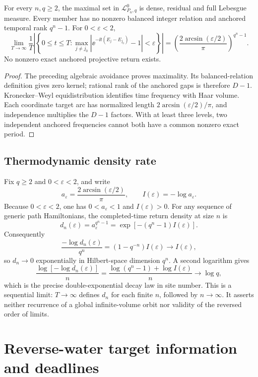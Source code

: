 \begin{theorem}
For every $n,q\ge2$, the maximal set in
$\mathcal L_{P_n,q}^0$ is dense, residual and full Lebesgue measure.  Every
member has no nonzero balanced integer relation and anchored temporal rank
$q^n-1$.  For $0<\varepsilon<2$,
\[
 \lim_{T\to\infty}\frac1T\left|\left\{0\le t\le T:
 \max_{j\ne j_0}|\ee^{-\ii t(E_j-E_{j_0})}-1|<\varepsilon
 \right\}\right|
 =\left(\frac{2\arcsin(\varepsilon/2)}\pi\right)^{q^n-1}.
\]
No nonzero exact anchored projective return exists.
\end{theorem}

\begin{proof}
The preceding algebraic avoidance proves maximality.  Its balanced-relation
definition gives zero kernel; rational rank of the anchored gaps is therefore
$D-1$.  Kronecker--Weyl equidistribution identifies time frequency with
Haar volume.  Each coordinate target arc has normalized length
$2\arcsin(\varepsilon/2)/\pi$, and independence multiplies the $D-1$
factors.  With at least three levels, two independent anchored frequencies
cannot both have a common nonzero exact period.
\end{proof}

\subsection{Thermodynamic density rate}

Fix $q\ge2$ and $0<\varepsilon<2$, and write
\[
 a_\varepsilon=\frac{2\arcsin(\varepsilon/2)}{\pi},
 \qquad I(\varepsilon)=-\log a_\varepsilon.
\]
Because $0<\varepsilon<2$, one has $0<a_\varepsilon<1$ and
$I(\varepsilon)>0$.  For any sequence of generic path Hamiltonians, the
completed-time return density at size $n$ is
\[
 d_n(\varepsilon)=a_\varepsilon^{q^n-1}
 =\exp[-(q^n-1)I(\varepsilon)].
\]
Consequently
\[
 \frac{-\log d_n(\varepsilon)}{q^n}
 =(1-q^{-n})I(\varepsilon)\longrightarrow I(\varepsilon),
\]
so $d_n\to0$ exponentially in Hilbert-space dimension $q^n$.  A second
logarithm gives
\[
 \frac{\log[-\log d_n(\varepsilon)]}{n}
 =\frac{\log(q^n-1)+\log I(\varepsilon)}{n}
 \longrightarrow\log q,
\]
which is the precise double-exponential decay law in site number.  This is a
sequential limit: $T\to\infty$ defines $d_n$ for each finite $n$, followed by
$n\to\infty$.  It asserts neither recurrence of a global infinite-volume
orbit nor validity of the reversed order of limits.

\section{Reverse-water target information and deadlines}
\label{app:water}


